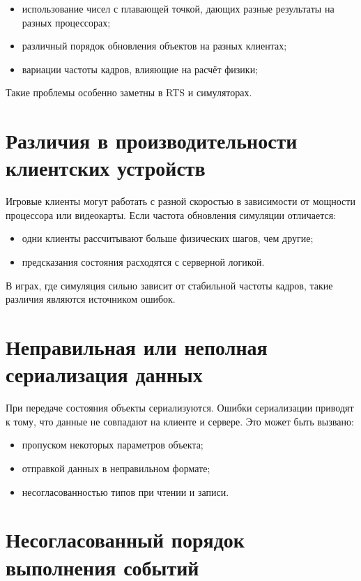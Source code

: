 \begin{itemize}
    \item использование чисел с плавающей точкой, дающих разные результаты на разных процессорах;
    \item различный порядок обновления объектов на разных клиентах;
    \item вариации частоты кадров, влияющие на расчёт физики;
\end{itemize}

Такие проблемы особенно заметны в RTS и симуляторах.

\section{Различия в производительности клиентских устройств}

Игровые клиенты могут работать с разной скоростью в зависимости от мощности процессора или видеокарты.
Если частота обновления симуляции отличается:

\begin{itemize}
    \item одни клиенты рассчитывают больше физических шагов, чем другие;
    \item предсказания состояния расходятся с серверной логикой.
\end{itemize}

В играх, где симуляция сильно зависит от стабильной частоты кадров, такие различия являются источником ошибок.

\section{Неправильная или неполная сериализация данных}

При передаче состояния объекты сериализуются.
Ошибки сериализации приводят к тому, что данные не совпадают на клиенте и сервере. Это может быть вызвано:

\begin{itemize}
    \item пропуском некоторых параметров объекта;
    \item отправкой данных в неправильном формате;
    \item несогласованностью типов при чтении и записи.
\end{itemize}

\section{Несогласованный порядок выполнения событий}

